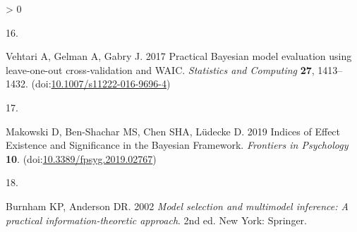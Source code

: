 \documentclass[
  a4paper,
]{article}
\newlength{\cslhangindent}
\newlength{\csllabelwidth}
\newenvironment{CSLReferences}[2] %
 {%
  \setlength{\parindent}{0pt}
  \ifodd #1 \everypar{\setlength{\hangindent}{\cslhangindent}}\ignorespaces\fi
  \ifnum #2 > 0
  \setlength{\parskip}{#2\baselineskip}
  \fi
 }%
 {}
\newcommand{\CSLLeftMargin}[1]{\parbox[t]{\csllabelwidth}{#1}}
\newcommand{\CSLRightInline}[1]{\parbox[t]{\linewidth - \csllabelwidth}{#1}\break}
\begin{document}
\begin{CSLReferences}{0}{0}
\leavevmode\hypertarget{ref-vehtari2017}{}%
\CSLLeftMargin{16. }
\CSLRightInline{Vehtari A, Gelman A, Gabry J. 2017 Practical {Bayesian}
model evaluation using leave-one-out cross-validation and {WAIC}.
\emph{Statistics and Computing} \textbf{27}, 1413--1432.
(doi:\href{https://doi.org/10.1007/s11222-016-9696-4}{10.1007/s11222-016-9696-4})}

\leavevmode\hypertarget{ref-makowski2019}{}%
\CSLLeftMargin{17. }
\CSLRightInline{Makowski D, Ben-Shachar MS, Chen SHA, Lüdecke D. 2019
Indices of {Effect Existence} and {Significance} in the {Bayesian
Framework}. \emph{Frontiers in Psychology} \textbf{10}.
(doi:\href{https://doi.org/10.3389/fpsyg.2019.02767}{10.3389/fpsyg.2019.02767})}

\leavevmode\hypertarget{ref-burnham2002}{}%
\CSLLeftMargin{18. }
\CSLRightInline{Burnham KP, Anderson DR. 2002 \emph{Model selection and
multimodel inference: A practical information-theoretic approach}. 2nd
ed. {New York}: {Springer}. }

\end{CSLReferences}
\end{document}
